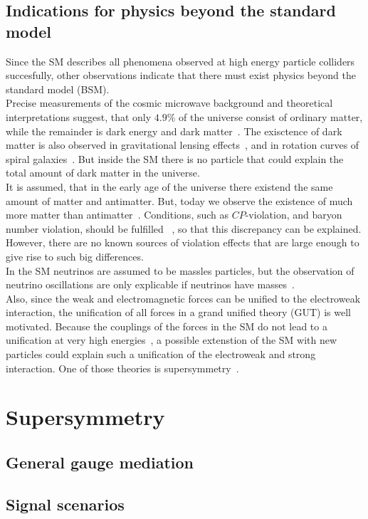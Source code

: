 \subsection{Indications for physics beyond the standard model}\label{sec:SM_bsm}
Since the SM describes all phenomena observed at high energy particle colliders succesfully, other observations indicate that there must exist physics beyond the standard model (BSM).\\
Precise measurements of the cosmic microwave background and theoretical interpretations suggest, that only $4.9\%$ of the universe consist of ordinary matter, while the remainder is dark energy and dark matter~\cite{DarkMatterPlanck}. The exisctence of dark matter is also observed in gravitational lensing effects~\cite{DarkMatterLensing}, and in rotation curves of spiral galaxies~\cite{DarkMatterRotation}. But inside the SM there is no particle that could explain the total amount of dark matter in the universe.\\
It is assumed, that in the early age of the universe there existend the same amount of matter and antimatter. But, today we observe the existence of much more matter than antimatter~\cite{Antimatter,AsymSM}. Conditions, such as $CP$-violation, and baryon number violation, should be fulfilled ~\cite{Sakharov}, so that this discrepancy can be explained. However, there are no known sources of violation effects that are large enough to give rise to such big differences.\\
In the SM neutrinos are assumed to be massles particles, but the observation of neutrino oscillations are only explicable if neutrinos have masses~\cite{NeutrinoMass,PDG}.\\
Also, since the weak and electromagnetic forces can be unified to the electroweak interaction, the unification of all forces in a grand unified theory (GUT) is well motivated. Because the couplings of the forces in the SM do not lead to a unification at very high energies~\cite{PDG}, a possible extenstion of the SM with new particles could explain such a unification of the electroweak and strong interaction. One of those theories is supersymmetry~\cite{SUSYPrimer}.


\section{Supersymmetry}\label{sec:SUSY}

\subsection{General gauge mediation}\label{sec:GGM}

\subsection{Signal scenarios}\label{sec:SMS}
